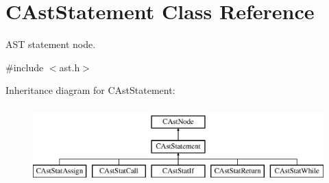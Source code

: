 \hypertarget{classCAstStatement}{\section{C\-Ast\-Statement Class Reference}
\label{classCAstStatement}
}


A\-S\-T statement node.  




{\ttfamily \#include $<$ast.\-h$>$}

Inheritance diagram for C\-Ast\-Statement\-:\begin{figure}[H]
\begin{center}
\leavevmode
\includegraphics[height=3.000000cm]{classCAstStatement}
\end{center}
\end{figure}
